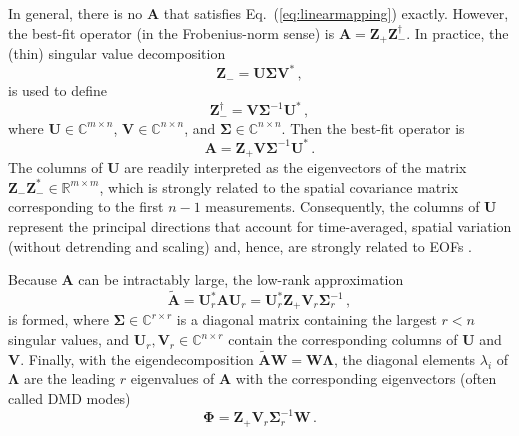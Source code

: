 \documentclass[review,number,sort&compress,12pt]{elsarticle}
\begin{document}
In general, there is no $\mathbf{A}$ that satisfies Eq.~(\ref{eq:linearmapping}) exactly.
However, the best-fit operator (in the Frobenius-norm sense) is $\mathbf{A} = \mathbf{Z}_+ \mathbf{Z}^{\dagger}_-$.
In practice, the (thin) singular value decomposition
\begin{equation}
 \mathbf{Z}_-=\mathbf{U\Sigma V}^*  \, ,
\end{equation}
is used to define 
\begin{equation}
 \mathbf{Z}^{\dagger}_- = \mathbf{V}\boldsymbol{\Sigma}^{-1}\mathbf{U}^* \, ,
\end{equation}
where $\mathbf{U} \in \mathbb{C}^{m\times n}$, $\mathbf{V} \in \mathbb{C}^{n\times n}$, and $\boldsymbol{\Sigma} \in \mathbb{C}^{n\times n}$.  
Then the best-fit operator is
\begin{equation}
 \mathbf{A} = \mathbf{Z}_+ \mathbf{V} \boldsymbol{\Sigma}^{-1}\mathbf{U}^* \, .
\end{equation}
The columns of $\mathbf{U}$ are readily interpreted as the eigenvectors of the matrix $\mathbf{Z}_{-} \mathbf{Z}_{-}^* \in \mathbb{R}^{m\times m}$, which is strongly related to the spatial covariance matrix corresponding to the first $n-1$ measurements.
Consequently, the columns of  $\mathbf{U}$ represent the principal directions that account for time-averaged, spatial variation (without detrending and scaling) and, hence, are strongly related to EOFs \cite{wikle2019sts}.


Because $\mathbf{A}$ can be intractably large, the low-rank approximation
\begin{equation}
 \tilde{\mathbf{A}} = \mathbf{U}^*_r \mathbf{A} \mathbf{U}_r = \mathbf{U}^*_r \mathbf{Z}_+ \mathbf{V}_r\boldsymbol{\Sigma}_r^{-1} \, ,
\end{equation}
is formed, where $\boldsymbol{\Sigma} \in \mathbb{C}^{r\times r}$ is a diagonal matrix containing the largest $r < n$ singular values, and  $\mathbf{U}_r, \mathbf{V}_r \in \mathbb{C}^{n\times r} $ contain the corresponding columns of $\mathbf{U}$ and $\mathbf{V}$.  
Finally, with the eigendecomposition $\tilde{\mathbf{A}}\mathbf{W} = \mathbf{W}\boldsymbol{\Lambda}$, the diagonal elements $\lambda_i$ of $\boldsymbol{\Lambda}$ are the leading $r$ eigenvalues of $\mathbf{A}$ with the corresponding eigenvectors (often called DMD modes)
\begin{equation}
 \boldsymbol{\Phi} = \mathbf{Z}_+ \mathbf{V}_r\boldsymbol{\Sigma}_r^{-1}\mathbf{W} \, .
\end{equation}
\end{document}
